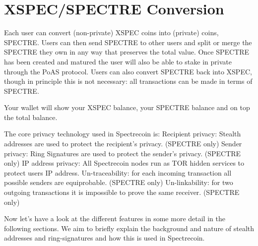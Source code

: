 \section{XSPEC/SPECTRE Conversion}
Each user can convert (non-private) XSPEC coins into (private) coins, SPECTRE. Users can then send SPECTRE to other users and split or merge the SPECTRE they own in any way that preserves the total value. Once SPECTRE has been created and matured the user will also be able to stake in private through the PoAS protocol. Users can also convert SPECTRE back into XSPEC, though in principle this is not necessary: all transactions can be made in terms of SPECTRE. 

 

Your wallet will show your XSPEC balance, your SPECTRE balance and on top the total balance. 

 

The core privacy technology used in Spectrecoin is: Recipient privacy: Stealth addresses are used to protect the recipient’s privacy. (SPECTRE only) Sender privacy: Ring Signatures are used to protect the sender’s privacy. (SPECTRE only) IP address privacy: All Spectrecoin nodes run as TOR hidden services to protect users IP address. Un-traceability: for each incoming transaction all possible senders are equiprobable. (SPECTRE only) Un-linkability: for two outgoing transactions it is impossible to prove the same receiver. (SPECTRE only) 

 

Now let’s have a look at the different features in some more detail in the following sections. We aim to briefly explain the background and nature of stealth addresses and ring-signatures and how this is used in 
Spectrecoin. 